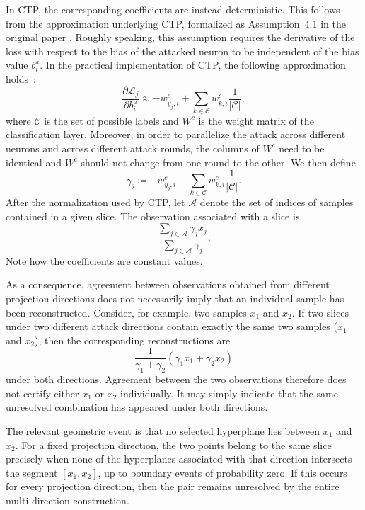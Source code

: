 In CTP, the corresponding coefficients are instead deterministic.
This follows from the approximation underlying CTP, formalized as
Assumption~4.1 in the original paper \cite{ctp_paper}. Roughly speaking, this
assumption requires the derivative of the loss with respect to the
bias of the attacked neuron to be independent of the bias value $b^{a}_i$. In the practical implementation of CTP, the following approximation holds~:
\begin{equation}
    \frac{\partial \mathcal L_j}{\partial b^{a}_i} \approx -w^{c}_{y_j,i} + \sum_{k \in \mathcal C} w^{c}_{k,i}\frac{1}{|\mathcal C|},
\end{equation}
where $\mathcal C$ is the set of possible labels and $W^{c}$ is the weight matrix of the classification layer. Moreover, in order to parallelize the attack across different neurons and across different attack rounds, the columns of  $W^{c}$ need to be identical and  $W^{c}$ should not change from one round to the other. We then define
\begin{equation}
    \gamma_j \coloneq -w^{c}_{y_j,i} + \sum_{k \in \mathcal C} w^{c}_{k,i}\frac{1}{|\mathcal C|}.
\end{equation}
After the normalization used by CTP, let $\mathcal A$ denote the set of indices of  samples contained in a given slice. The observation
associated with a slice is
\begin{equation}
    \frac{\sum_{j \in\mathcal{A}} \gamma_j x_j}{\sum_{j \in\mathcal{A}} \gamma_j}.
    \label{eq:ctp-slice-observation}
\end{equation}
Note how the coefficients are constant values.

As a consequence, agreement between observations obtained from
different projection directions does not necessarily imply that an
individual sample has been reconstructed. Consider, for example, two
samples $x_1$ and $x_2$. If two slices under two different attack directions contain exactly the same two samples ($x_1$ and $x_2$), then the corresponding reconstructions are
\begin{equation}
    \frac{1}{\gamma_1 + \gamma_2}(\gamma_1 x_1+ \gamma_2 x_2)
    \label{eq:ctp-two-sample-combination}
\end{equation}
under both directions. Agreement between the two observations
therefore does not certify either $x_1$ or $x_2$ individually. It may
simply indicate that the same unresolved combination has appeared
under both directions.

The relevant geometric event is that no selected hyperplane lies
between $x_1$ and $x_2$. For a fixed projection direction, the two points
belong to the same slice precisely when none of the hyperplanes
associated with that direction intersects the segment $[x_1,x_2]$, up to
boundary events of probability zero. If this occurs for every
projection direction, then the pair remains unresolved by the entire
multi-direction construction.

